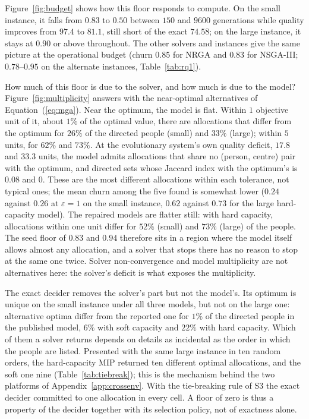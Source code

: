\documentclass[systems,article,accept,moreauthors,pdftex]{Definitions/mdpi}
\begin{document}
Figure~\ref{fig:budget} shows how this floor responds to compute. On the small instance, it
falls from $0.83$ to $0.50$ between $150$ and $9600$ generations while quality improves
from $97.4$ to $81.1$, still short of the exact $74.58$; on the large instance, it stays at
$0.90$ or above throughout. The other solvers and instances give the same picture at the
operational budget (churn $0.85$ for NRGA and $0.83$ for NSGA-III; $0.78$--$0.95$ on the
alternate instances, Table~\ref{tab:rq1}).

How much of this floor is due to the solver, and how much is due to the model?
Figure~\ref{fig:multiplicity} answers with the near-optimal alternatives of
Equation~(\ref{eq:mga}). Near the optimum, the model is flat. Within $1$ objective unit of it, about
$1\%$ of the optimal value, there are allocations that differ from the optimum for $26\%$ of the
directed people (small) and $33\%$ (large); within \linebreak  $5$ units, for $62\%$ and $73\%$. At the
evolutionary system's own quality deficit, $17.8$ and \linebreak  $33.3$ units, the model admits
allocations that share no (person, centre) pair with the optimum, and directed sets whose
Jaccard index with the optimum's is $0.08$ and $0$. These are the most different allocations
within each tolerance, not typical ones; the mean churn among the five found is somewhat lower
($0.24$ against $0.26$ at $\varepsilon = 1$ on the small instance, $0.62$ against $0.73$ for the
large hard-capacity model). The repaired models are flatter still: with
hard capacity, allocations within one unit differ for $52\%$ (small) and $73\%$ (large) of the
people. The seed floor of $0.83$ and $0.94$ therefore sits in a region where the model itself
allows almost any allocation, and a solver that stops there has no reason to stop at the same
one twice. Solver non-convergence and model multiplicity are not alternatives here: the solver's
deficit is what exposes the multiplicity.

The exact decider removes the solver's part but not the model's. Its optimum is unique on the
small instance under all three models, but not on the large one: alternative optima differ
from the reported one for $1\%$ of the directed people in the published model, $6\%$ with soft
capacity and $22\%$ with hard capacity. Which of them a solver returns depends on details as
incidental as the order in which the people are listed. Presented with the same large instance
in ten random orders, the hard-capacity MIP returned ten different optimal allocations, and the
soft one nine (Table~\ref{tab:tiebreak}); this is the mechanism behind the \linebreak  two platforms of
Appendix~\ref{app:crossenv}. With the tie-breaking rule of S3 the exact decider committed to
one allocation in every cell. A floor of zero is thus a property of the decider together with
its selection policy, not of exactness alone.
\end{document}
